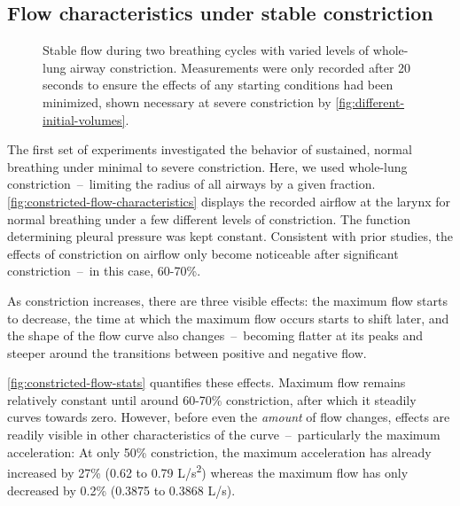 \subsection{Flow characteristics under stable constriction} \label{sec:flow-characteristics}

\begin{figure}[ht!]
    \centering
    \begin{tikzpicture}
        
    \end{tikzpicture}
    \caption{
        Stable flow during two breathing cycles with varied levels of whole-lung airway
        constriction. Measurements were only recorded after 20 seconds to ensure the effects of any
        starting conditions had been minimized, shown necessary at severe constriction by
        \autoref{fig:different-initial-volumes}.
    }
    \label{fig:constricted-flow-characteristics}
\end{figure}

The first set of experiments investigated the behavior of sustained, normal breathing under minimal
to severe constriction. Here, we used whole-lung constriction~--~limiting the radius of all airways
by a given fraction. \autoref{fig:constricted-flow-characteristics} displays the recorded airflow at
the larynx for normal breathing under a few different levels of constriction. The function
determining pleural pressure was kept constant. Consistent with prior studies, the effects of
constriction on airflow only become noticeable after significant constriction~--~in this case,
60-70\%.


As constriction increases, there are three visible effects: the maximum flow starts to decrease, the
time at which the maximum flow occurs starts to shift later, and the shape of the flow curve also
changes~--~becoming flatter at its peaks and steeper around the transitions between positive and
negative flow.

\autoref{fig:constricted-flow-stats} quantifies these effects. Maximum flow remains relatively
constant until around 60-70\% constriction, after which it steadily curves towards zero. However,
before even the \textit{amount} of flow changes, effects are readily visible in other
characteristics of the curve~--~particularly the maximum acceleration: At only 50\% constriction,
the maximum acceleration has already increased by 27\% (0.62 to 0.79 L/s\textsuperscript{2}) whereas
the maximum flow has only decreased by 0.2\% (0.3875 to 0.3868 L/s).


